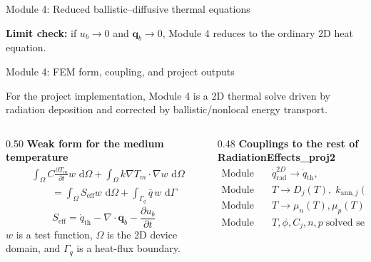 \documentclass[aspectratio=169,9pt]{beamer}
\newcommand{\qvec}{\bm{q}}
\newcommand{\qrad}{\dot{q}_{\mathrm{rad}}}
\newcommand{\qth}{\dot{q}_{\mathrm{th}}}
\newcommand{\dd}{\,\mathrm{d}}
\begin{document}
\begin{frame}{Module 4: Reduced ballistic--diffusive thermal equations}
\vspace{1mm}
\begin{greenbox}
\centering\scriptsize
\textbf{Limit check:} if \(u_b\to0\) and \(\qvec_b\to0\), Module 4 reduces to the ordinary 2D heat equation.
\end{greenbox}
\end{frame}

\begin{frame}{Module 4: FEM form, coupling, and project outputs}
\footnotesize
\vspace{-4mm}
\begin{bluebox}
\centering\small
For the project implementation, Module 4 is a 2D thermal solve driven by radiation deposition and corrected by ballistic/nonlocal energy transport.
\end{bluebox}

\vspace{1mm}
\begin{columns}[T,totalwidth=\textwidth]
\begin{column}{0.50\textwidth}
\textbf{Weak form for the medium temperature}
\begin{equation*}
\boxed{
\begin{aligned}
&\int_\Omega C\frac{\partial T_m}{\partial t}w\,\dd\Omega
+\int_\Omega k\nabla T_m\cdot\nabla w\,\dd\Omega \\
&\qquad =\int_\Omega S_{\mathrm{eff}}w\,\dd\Omega
+\int_{\Gamma_q}\bar q\,w\,\dd\Gamma
\end{aligned}}
\end{equation*}
\begin{equation*}
\boxed{S_{\mathrm{eff}}=\qth-\nabla\cdot\qvec_b-\frac{\partial u_b}{\partial t}}
\end{equation*}
\small
\(w\) is a test function, \(\Omega\) is the 2D device domain, and \(\Gamma_q\) is a heat-flux boundary.
\end{column}

\begin{column}{0.48\textwidth}
\textbf{Couplings to the rest of RadiationEffects\_proj2}
\begin{align*}
\text{Module 1:}\quad & \qrad^{2D}\rightarrow \qth,\\[-0.5mm]
\text{Module 3:}\quad & T\rightarrow D_j(T),\; k_{\mathrm{ann},j}(T),\\[-0.5mm]
\text{Module 5:}\quad & T\rightarrow \mu_n(T),\mu_p(T),R_{\mathrm{SRH}}(T),\\[-0.5mm]
\text{Module 6:}\quad & T,\phi,C_j,n,p \;\text{solved self-consistently.}
\end{align*}
\small


\end{column}
\end{columns}
\end{frame}
\end{document}
